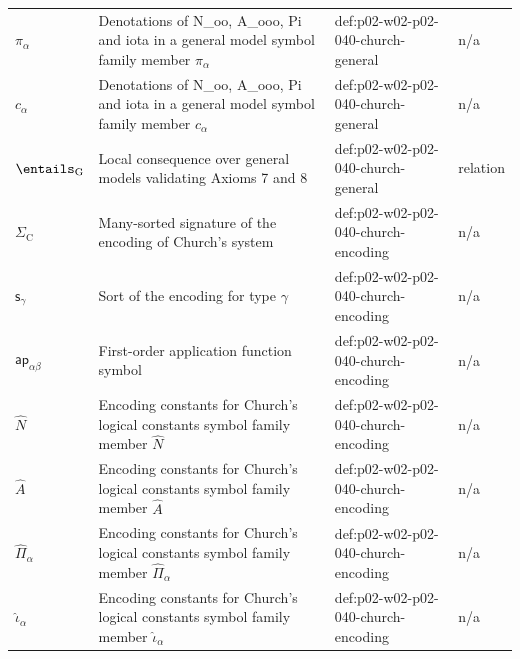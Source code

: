 \begin{longtable}{@{}p{}p{}p{}p{}@{}}
\(\pi_\alpha\) & Denotations of N\_oo, A\_ooo, Pi and iota in a general model symbol family member \(\pi_\alpha\) & def:\allowbreak{}p02-\allowbreak{}w02-\allowbreak{}p02-\allowbreak{}040-\allowbreak{}church-\allowbreak{}general & n/a \\
\(c_\alpha\) & Denotations of N\_oo, A\_ooo, Pi and iota in a general model symbol family member \(c_\alpha\) & def:\allowbreak{}p02-\allowbreak{}w02-\allowbreak{}p02-\allowbreak{}040-\allowbreak{}church-\allowbreak{}general & n/a \\
\(\entails_{\mathrm G}\) & Local consequence over general models validating Axioms 7 and 8 & def:\allowbreak{}p02-\allowbreak{}w02-\allowbreak{}p02-\allowbreak{}040-\allowbreak{}church-\allowbreak{}general & relation \\
\(\Sigma_{\mathrm C}\) & Many-sorted signature of the encoding of Church's system & def:\allowbreak{}p02-\allowbreak{}w02-\allowbreak{}p02-\allowbreak{}040-\allowbreak{}church-\allowbreak{}encoding & n/a \\
\(\mathsf s_\gamma\) & Sort of the encoding for type \(\gamma\) & def:\allowbreak{}p02-\allowbreak{}w02-\allowbreak{}p02-\allowbreak{}040-\allowbreak{}church-\allowbreak{}encoding & n/a \\
\(\mathsf{ap}_{\alpha\beta}\) & First-order application function symbol & def:\allowbreak{}p02-\allowbreak{}w02-\allowbreak{}p02-\allowbreak{}040-\allowbreak{}church-\allowbreak{}encoding & n/a \\
\(\widehat N\) & Encoding constants for Church's logical constants symbol family member \(\widehat N\) & def:\allowbreak{}p02-\allowbreak{}w02-\allowbreak{}p02-\allowbreak{}040-\allowbreak{}church-\allowbreak{}encoding & n/a \\
\(\widehat A\) & Encoding constants for Church's logical constants symbol family member \(\widehat A\) & def:\allowbreak{}p02-\allowbreak{}w02-\allowbreak{}p02-\allowbreak{}040-\allowbreak{}church-\allowbreak{}encoding & n/a \\
\(\widehat\Pi_\alpha\) & Encoding constants for Church's logical constants symbol family member \(\widehat\Pi_\alpha\) & def:\allowbreak{}p02-\allowbreak{}w02-\allowbreak{}p02-\allowbreak{}040-\allowbreak{}church-\allowbreak{}encoding & n/a \\
\(\widehat\iota_\alpha\) & Encoding constants for Church's logical constants symbol family member \(\widehat\iota_\alpha\) & def:\allowbreak{}p02-\allowbreak{}w02-\allowbreak{}p02-\allowbreak{}040-\allowbreak{}church-\allowbreak{}encoding & n/a \\

\end{longtable}
